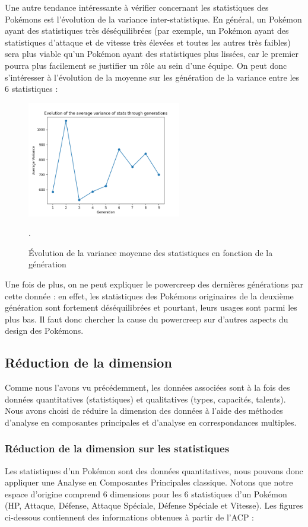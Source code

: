 \documentclass[a4paper,12pt]{article}
\begin{document}
Une autre tendance intéressante à vérifier concernant les statistiques des
Pokémons est l'évolution de la variance inter-statistique. En général, un
Pokémon ayant des statistiques très déséquilibrées (par exemple, un Pokémon
ayant des statistiques d'attaque et de vitesse très élevées et toutes les autres
très faibles) sera plus viable qu'un Pokémon ayant des statistiques plus
lissées, car le premier pourra plus facilement se justifier un rôle au sein
d'une équipe. On peut donc s'intéresser à l'évolution de la moyenne sur les
génération de la variance entre les 6 statistiques :

\begin{figure}[htbp]
    \centering
    \includegraphics[width=0.6\textwidth]{Image/avg_var_stats_per_generation.png}
    \caption{Évolution de la variance moyenne des statistiques en fonction de la
    génération}.
    \label{fig:image6}
\end{figure}

Une fois de plus, on ne peut expliquer le powercreep des dernières générations
par cette donnée : en effet, les statistiques des Pokémons originaires de la
deuxième génération sont fortement déséquilibrées et pourtant, leurs usages sont
parmi les plus bas. Il faut donc chercher la cause du powercreep sur d'autres
aspects du design des Pokémons.

\subsection{Réduction de la dimension}
Comme nous l'avons vu précédemment, les données associées sont à la fois des
données quantitatives (statistiques) et qualitatives (types, capacités,
talents). Nous avons choisi de réduire la dimension des données à l'aide
des méthodes d'analyse en composantes principales et d'analyse en
correspondances multiples.

\subsubsection{Réduction de la dimension sur les statistiques}
Les statistiques d'un Pokémon sont des données quantitatives, nous pouvons donc
appliquer une Analyse en Composantes Principales classique. Notons que notre
espace d'origine comprend 6 dimensions pour les 6 statistiques d'un Pokémon (HP,
Attaque, Défense, Attaque Spéciale, Défense Spéciale et Vitesse). Les figures
ci-dessous contiennent des informations obtenues à partir de l'ACP :
\end{document}

